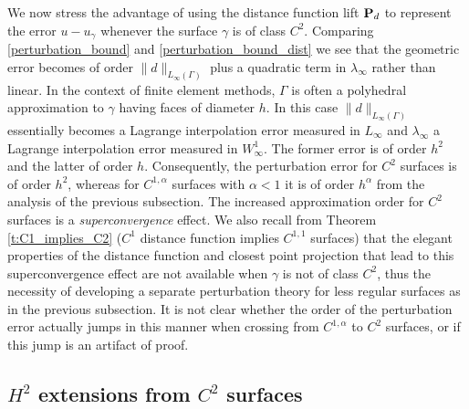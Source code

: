 We now stress the advantage of using the distance function lift ${\bf P}_d$ to
represent the error $u-u_\gamma$ whenever the surface $\gamma$ is of class $C^2$.
Comparing \eqref{perturbation_bound} and
\eqref{perturbation_bound_dist} we see that the geometric error becomes of order $\|d\|_{L_\infty(\Gamma)}$ plus a quadratic term in $\lambda_\infty$ rather than linear. In the context of finite element methods, $\Gamma$ is often a polyhedral approximation to $\gamma$ having faces of diameter $h$. In this case $\|d\|_{L_\infty(\Gamma)}$ essentially becomes a Lagrange interpolation error measured in $L_\infty$ and $\lambda_\infty$ a Lagrange interpolation error measured in $W_\infty^1$.  The former error is of order $h^2$ and the latter of order $h$. Consequently, the perturbation error for $C^2$ surfaces is of order $h^2$, whereas for $C^{1,\alpha}$ surfaces with $\alpha<1$ it is of order $h^{\alpha}$ from the analysis of the previous subsection.  The increased approximation order for $C^2$ surfaces is a {\it superconvergence} effect.  We also recall from Theorem \ref{t:C1_implies_C2} ($C^1$ distance function implies $C^{1,1}$ surfaces) that the elegant properties of the distance function and closest point projection that lead to this superconvergence effect are not available when $\gamma$ is not of class $C^2$, thus the necessity of developing a separate perturbation theory for less regular surfaces as in the previous subsection.  It is not clear whether the order of the perturbation error actually jumps in this manner when crossing from $C^{1,\alpha}$ to $C^2$ surfaces, or if this jump is an artifact of proof.
 

\subsection{$H^2$ extensions from $C^2$ surfaces}
\label{S:apriori-C1a}

